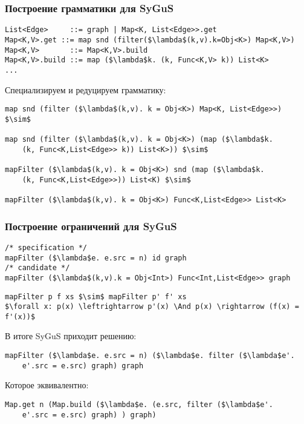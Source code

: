 \documentclass[14pt]{beamer}
\begin{document}
\begin{frame}[fragile]
\frametitle{Построение грамматики для SyGuS}
\begin{lstlisting}[language=SyGuSLang, mathescape=true]
List<Edge>     ::= graph | Map<K, List<Edge>>.get
Map<K,V>.get ::= map snd (filter($\lambda$(k,v).k=Obj<K>) Map<K,V>)
Map<K,V>       ::= Map<K,V>.build
Map<K,V>.build ::= map ($\lambda$k. (k, Func<K,V> k)) List<K>
...
\end{lstlisting}
Специализируем и редуцируем грамматику:
\begin{lstlisting}[language=SyGuSLang, mathescape=true]
map snd (filter ($\lambda$(k,v). k = Obj<K>) Map<K, List<Edge>>) $\sim$

map snd (filter ($\lambda$(k,v). k = Obj<K>) (map ($\lambda$k.
    (k, Func<K,List<Edge>> k)) List<K>)) $\sim$

mapFilter ($\lambda$(k,v). k = Obj<K>) snd (map ($\lambda$k.
    (k, Func<K,List<Edge>>)) List<K) $\sim$

mapFilter ($\lambda$(k,v). k = Obj<K>) Func<K,List<Edge>> List<K>
\end{lstlisting}
\end{frame}


\begin{frame}[fragile]
\frametitle{Построение ограничений для SyGuS}

\begin{lstlisting}[language=SyGuSLang, mathescape=true]
/* specification */
mapFilter ($\lambda$e. e.src = n) id graph
/* candidate */
mapFilter ($\lambda$(k,v).k = Obj<Int>) Func<Int,List<Edge>> graph
\end{lstlisting}


\begin{lstlisting}[language=SyGuSLang, mathescape=true]
mapFilter p f xs $\sim$ mapFilter p' f' xs
$\forall x: p(x) \leftrightarrow p'(x) \And p(x) \rightarrow (f(x) = f'(x))$
\end{lstlisting}

В итоге SyGuS приходит решению:
\begin{lstlisting}[language=SyGuSLang, mathescape=true]
mapFilter ($\lambda$e. e.src = n) ($\lambda$e. filter ($\lambda$e'.
    e'.src = e.src) graph) graph
\end{lstlisting}

Которое эквивалентно:
\begin{lstlisting}[language=SolutionLang, mathescape=true]
Map.get n (Map.build ($\lambda$e. (e.src, filter ($\lambda$e'.
    e'.src = e.src) graph) ) graph)
\end{lstlisting}
\end{frame}
\end{document}
